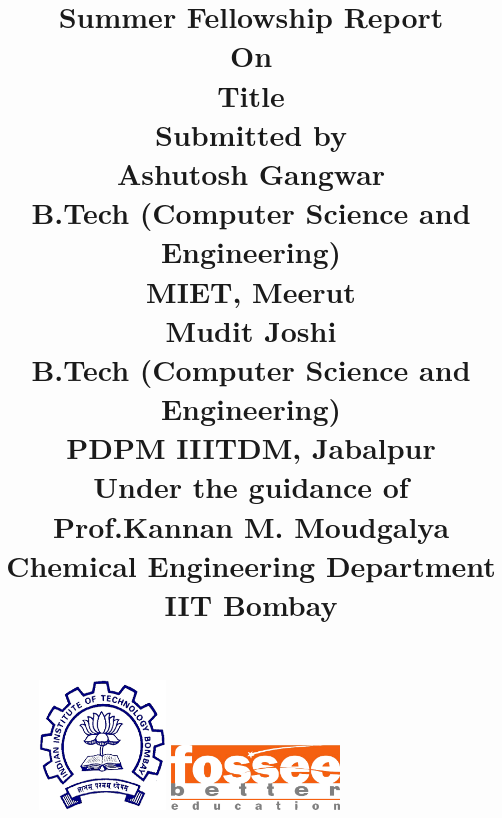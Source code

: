 \documentclass[12pt,a4paper]{report}
\begin{document}
\begin{figure}
\centering
\includegraphics[width = 0.3\textwidth]{iit}
\hspace{1cm}
\includegraphics[width = 0.4\textwidth]{fossee-logo.png}
\end{figure}

\title{\textbf{\textbf{Summer Fellowship Report}}\vspace{4mm} \\\small On \\\vspace{4mm} \textbf{\large Title}\\ \vspace{4mm}\small Submitted by\\  \vspace{4mm}  \large \textbf{Ashutosh Gangwar}\\ \vspace{1mm} B.Tech (Computer Science and Engineering)\\ MIET, Meerut\\ \vspace{4mm} \large \textbf{Mudit Joshi}\\ \vspace{1mm} B.Tech (Computer Science and Engineering)\\ PDPM IIITDM, Jabalpur\\ \vspace{4mm} \small Under the guidance of \\ \vspace{4mm}
	\large \textbf{Prof.Kannan M. Moudgalya} \vspace{1mm}\\ Chemical Engineering Department  \vspace{1mm} \\IIT Bombay
}

\maketitle
\end{document}
